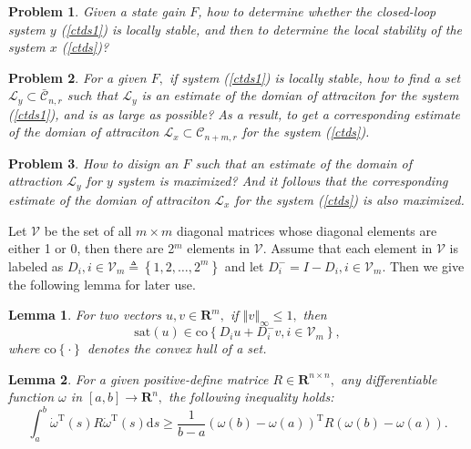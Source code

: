 \documentclass[9pt]{article}%
\newtheorem{lemma}{Lemma}
\newtheorem{problem}{Problem}
\begin{document}
\begin{problem}
Given a state gain $F$, how to determine whether the closed-loop system $y$
(\ref{ctds1}) is locally stable, and then to determine the local stability of
the system $x$ (\ref{ctds})?
\end{problem}

\begin{problem}
For a given $F,$ if system (\ref{ctds1}) is locally stable, how to find a set
$\mathcal{L}_{y}\subset \mathcal{\bar{C}}_{n,r}$ such that $\mathcal{L}_{y}$ is
an estimate of the domian of attraciton for the system (\ref{ctds1}), and is
as large as possible? As a result, to get a corresponding estimate of the
domian of attraciton $\mathcal{L}_{x}\subset \mathcal{C}_{n+m,r}$ for the
system (\ref{ctds}).
\end{problem}

\begin{problem}
How to disign an $F$ such that an estimate of the domain of attraction
$\mathcal{L}_{y}$ for $y$ system is maximized? And it follows that the
corresponding estimate of the domian of attraciton $\mathcal{L}_{x}$ for the
system (\ref{ctds}) is also maximized.
\end{problem}

Let $\mathcal{V}$ be the set of all $m\times m$ diagonal matrices whose
diagonal elements are either 1 or 0, then there are 2$^{m}$ elements in
$\mathcal{V}.$ Assume that each element in $\mathcal{V}$ is labeled as
$D_{i},i\in \mathcal{V}_{m}\triangleq \left \{  1,2,\ldots,2^{m}\right \}  $ and
let $D_{i}^{-}=I-D_{i},i\in \mathcal{V}_{m}.$ Then we give the following lemma
for later use.

\begin{lemma}
\label{lemma1}For two vectors $u,v\in \mathbf{R}^{m},$ if $\left \Vert
v\right \Vert _{\infty}\leq1,$ then%
\[
\mathrm{sat}\left(  u\right)  \in \mathrm{co}\left \{  D_{i}u+D_{i}^{-}%
v,i\in \mathcal{V}_{m}\right \}  ,
\]
where $\mathrm{co}\left \{  \cdot \right \}  $ denotes the convex hull of a set.
\end{lemma}

\begin{lemma}
\label{lemma2}For a given positive-define matrice $R\in \mathbf{R}^{n\times
n},$ any differentiable function $\omega$ in $\left[  a,b\right]
\longrightarrow \mathbf{R}^{n},$ the following inequality holds:%
\begin{equation}
\int_{a}^{b}\dot{\omega}^{\mathrm{T}}\left(  s\right)  R\dot{\omega
}^{\mathrm{T}}\left(  s\right)  \mathrm{d}s\geq \frac{1}{b-a}\left(
\omega \left(  b\right)  -\omega \left(  a\right)  \right)  ^{\mathrm{T}%
}R\left(  \omega \left(  b\right)  -\omega \left(  a\right)  \right)  .
\label{eq17}%
\end{equation}

\end{lemma}
\end{document}
